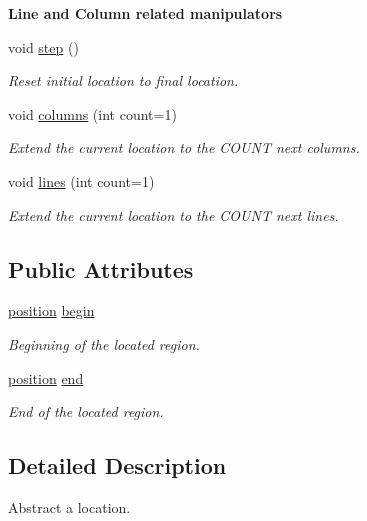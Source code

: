 \begin{Indent}{\bf Line and Column related manipulators}\par
\begin{DoxyCompactItemize}
\item 
void \hyperlink{classyy_1_1location_a96620cec8dd8ebfc96c60a03c10154d0}{step} ()
\begin{DoxyCompactList}\small\item\em Reset initial location to final location. \end{DoxyCompactList}\item 
void \hyperlink{classyy_1_1location_ae232b2eb7ad3aed7f5c2b080d64d931d}{columns} (int count=1)
\begin{DoxyCompactList}\small\item\em Extend the current location to the C\-O\-U\-N\-T next columns. \end{DoxyCompactList}\item 
void \hyperlink{classyy_1_1location_aca7f94cd71a67d27f1c90e54d8cd4ff6}{lines} (int count=1)
\begin{DoxyCompactList}\small\item\em Extend the current location to the C\-O\-U\-N\-T next lines. \end{DoxyCompactList}\end{DoxyCompactItemize}
\end{Indent}
\subsection*{Public Attributes}
\begin{DoxyCompactItemize}
\item 
\hyperlink{classyy_1_1position}{position} \hyperlink{classyy_1_1location_a70540e90479a85db4112b552d7e032cf}{begin}
\begin{DoxyCompactList}\small\item\em Beginning of the located region. \end{DoxyCompactList}\item 
\hyperlink{classyy_1_1position}{position} \hyperlink{classyy_1_1location_aa9be2a89fdb63da08167ebd4b819addd}{end}
\begin{DoxyCompactList}\small\item\em End of the located region. \end{DoxyCompactList}\end{DoxyCompactItemize}


\subsection{Detailed Description}
Abstract a location. 

